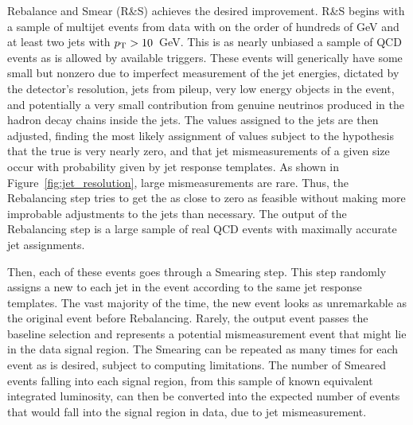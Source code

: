     Rebalance and Smear (R\&S) achieves the desired improvement.
    R\&S begins with a sample of multijet events from data with \Ht on the order of hundreds of GeV and at least two jets with $p_{\mathrm{T}} > 10$~GeV.
    This is as nearly unbiased a sample of QCD events as is allowed by available triggers.
    These events will generically have some small but nonzero \met due to imperfect measurement of the jet energies, dictated by the detector's resolution, jets from pileup, very low energy objects in the event, and potentially a very small contribution from genuine neutrinos produced in the hadron decay chains inside the jets.
    The \pt values assigned to the jets are then adjusted, finding the most likely assignment of \pt values subject to the hypothesis that the true \met is very nearly zero, and that jet mismeasurements of a given size occur with probability given by jet response templates.
    As shown in Figure~\ref{fig:jet_resolution}, large mismeasurements are rare.
    Thus, the Rebalancing step tries to get the \pt as close to zero as feasible without making more improbable adjustments to the jets than necessary.
    The output of the Rebalancing step is a large sample of real QCD events with maximally accurate jet \pt assignments.

    Then, each of these events goes through a Smearing step.
    This step randomly assigns a new \pt to each jet in the event according to the same jet response templates.
    The vast majority of the time, the new event looks as unremarkable as the original event before Rebalancing.
    Rarely, the output event passes the baseline selection and represents a potential mismeasurement event that might lie in the data signal region.
    The Smearing can be repeated as many times for each event as is desired, subject to computing limitations.
    The number of Smeared events falling into each signal region, from this sample of known equivalent integrated luminosity, can then be converted into the expected number of events that would fall into the signal region in data, due to jet mismeasurement.
    
